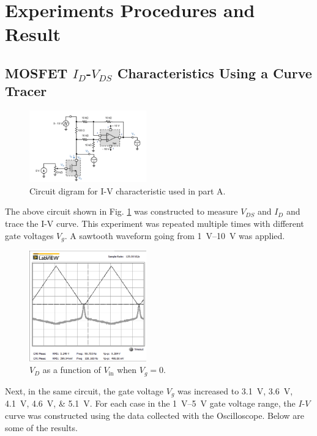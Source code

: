 \documentclass[journal]{IEEEtran}
\begin{document}
\section{Experiments Procedures and Result}
\subsection{MOSFET $I_{D}$-$V_{DS}$ Characteristics Using a Curve Tracer}
\begin{figure}[h]
  \centering
  \includegraphics[width=0.45\textwidth]{images/1.png}
  \caption{Circuit digram for I-V characteristic used in part A.}
  \label{fig-1}
\end{figure}
\par The above circuit shown in Fig. \ref{fig-1} was constructed to measure $V_{DS}$ and $I_{D}$
and trace the I-V curve. This experiment was repeated multiple times with different
gate voltages $V_{g}$. A sawtooth waveform going from \SIrange{1}{10}{\volt} was applied.
\begin{figure}[h]
  \centering
  \includegraphics[width=0.45\textwidth]{images/1-2Vt.png}
  \caption{$V_{D}$ as a function of $V_{\text{in}}$ when $V_{g}=0$.}
  \label{fig-2}
\end{figure}
\par Next, in the same circuit, the gate voltage $V_{g}$ was increased to
\SIlist{3.1;3.6;4.1;4.6;5.1}{\volt}. For each case in the \SIrange{1}{5}{\volt}
gate voltage range, the $I$-$V$ curve was constructed using the data collected
with the Oscilloscope. Below are some of the results.
\end{document}

